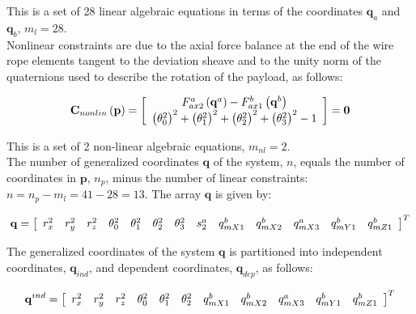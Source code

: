 \setlength{\parindent}{0cm}
This is a set of 28 linear algebraic equations in terms of the coordinates $\textbf{q}_a$ and $\textbf{q}_b$, $m_l = 28$.\\     

Nonlinear constraints are due to the axial force balance at the end of the wire rope elements tangent to the deviation sheave and to the unity norm of the quaternions used to describe the rotation of the payload, as follows: 

\begin{equation} 
{{\bf{C}}_{nonlin}}\left( {\bf{p}} \right) = \left[ {\begin{array}{*{20}{c}}
{F_{ax2}^a\left( {{{\bf{q}}^a}} \right) - F_{ax1}^b\left( {{{\bf{q}}^b}} \right)}\\
{{{\left( {\theta _0^2} \right)}^2} + {{\left( {\theta _1^2} \right)}^2} + {{\left( {\theta _2^2} \right)}^2} + {{\left( {\theta _3^2} \right)}^2} - 1}
\end{array}} \right] = {\bf{0}}
\label{WRnl}
\end{equation}

\setlength{\parindent}{0cm}
This is a set of 2 non-linear algebraic equations, $m_{nl} = 2$.\\

The number of generalized coordinates $\textbf{q}$ of the system, $n$, equals the number of coordinates in $\textbf{p}$, $n_p$, minus the number of linear constraints: $n = {n_p} - {m_l} = 41 - 28 = 13$.
The array $\textbf{q}$ is given by:

\begin{equation} \label{setq_Elev}
{\bf{q}} = {\left[ {\begin{array}{*{20}{c}}
{r_x^2}&{r_y^2}&{r_z^2}&{\theta _0^2}&{\theta _1^2}&{\theta _2^2}&{\theta _3^2}&{s_2^a}&{q_{mX1}^b}&{q_{mX2}^b}&{q_{mX3}^a}&{q_{mY1}^b}&{q_{mZ1}^b}
\end{array}} \right]^T}
\end{equation}

The generalized coordinates of the system $\textbf{q}$ is partitioned into independent coordinates, $\textbf{q}_{ind}$, and dependent coordinates, $\textbf{q}_{dep}$, as follows: 

\begin{equation} \label{subsetsq_Elev}
{{\bf{q}}^{ind}} = {\left[ {\begin{array}{*{20}{c}}
{r_x^2}&{r_y^2}&{r_z^2}&{\theta _0^2}&{\theta _1^2}&{\theta _2^2}&{q_{mX1}^b}&{q_{mX2}^b}&{q_{mX3}^a}&{q_{mY1}^b}&{q_{mZ1}^b}
\end{array}} \right]^T}
\end{equation}

